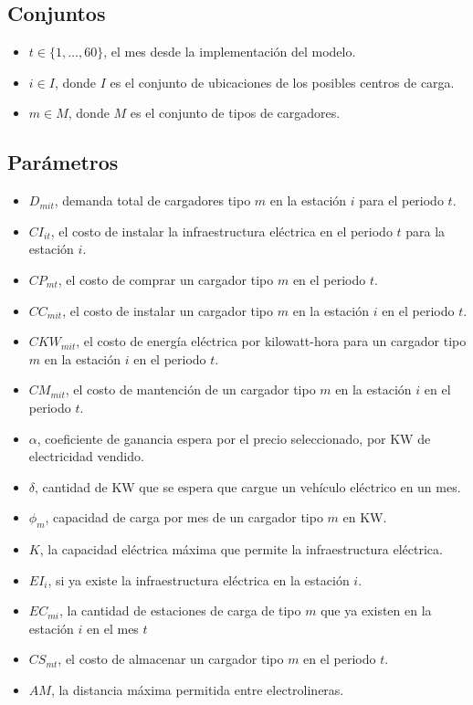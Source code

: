 \documentclass[letterpaper]{article}
\begin{document}
\begin{flushleft}
	\subsection{Conjuntos}
	\begin{itemize}
		\item $t \in \{1, \ldots, 60\}$, el mes desde la implementación del modelo.
		\item $i \in I$, donde $I$ es el conjunto de ubicaciones de los posibles centros de carga.
		\item $m \in M$, donde $M$ es el conjunto de tipos de cargadores.
	\end{itemize}

	\subsection{Parámetros}
	\begin{itemize}
		\item $D_{mit}$, demanda total de cargadores tipo $m$ en la estación $i$ para el periodo $t$.
		\item $CI_{it}$, el costo de instalar la infraestructura el\'ectrica en el periodo $t$ para la estaci\'on $i$.
		\item $CP_{mt}$, el costo de comprar un cargador tipo $m$ en el periodo $t$.
		\item $CC_{mit}$, el costo de instalar un cargador tipo $m$ en la estación $i$ en el periodo $t$.
		\item $CKW_{mit}$, el costo de energía eléctrica por kilowatt-hora para un cargador tipo $m$ en la estación $i$ en el periodo $t$.
		\item $CM_{mit}$, el costo de mantención de un cargador tipo $m$ en la estación $i$ en el periodo $t$.
		\item $\alpha$, coeficiente de ganancia espera por el precio seleccionado, por KW de electricidad vendido.
		\item $\delta$, cantidad de KW que se espera que cargue un vehículo eléctrico en un mes.
		\item $\phi_m$, capacidad de carga por mes de un cargador tipo $m$ en KW.
		\item $K$, la capacidad eléctrica máxima que permite la infraestructura eléctrica.
		\item $EI_{i}$, si ya existe la infraestructura eléctrica en la estación $i$.
		\item $EC_{mi}$, la cantidad de estaciones de carga de tipo $m$ que ya existen en la estación $i$ en el mes $t$
		\item $CS_{mt}$, el costo de almacenar un cargador tipo $m$ en el periodo $t$.
		\item $AM$, la distancia máxima permitida entre electrolineras.
	\end{itemize}

\end{flushleft}
\end{document}
